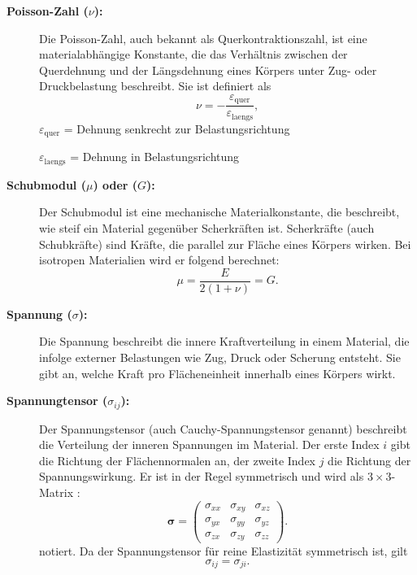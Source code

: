 \begin{description}
\item[\textbf{Poisson-Zahl ($\nu$):}]
Die Poisson-Zahl, auch bekannt als Querkontraktionszahl, ist eine
%
%
materialabhängige Konstante, die das Verhältnis zwischen der
Querdehnung und der Längsdehnung eines Körpers unter Zug- oder
%
Druckbelastung beschreibt.
Sie ist definiert als
	\begin{equation*}
		\nu=
		-\frac{\varepsilon_\text{quer}}{\varepsilon_\text{laengs}},
	\end{equation*}
	$\varepsilon_\text{quer}$ = Dehnung senkrecht zur Belastungsrichtung
	
	$\varepsilon_\text{laengs}$ = Dehnung in Belastungsrichtung
	
\item[\textbf{Schubmodul ($\mu$) oder ($G$):}]
Der Schubmodul ist eine mechanische Materialkonstante, die beschreibt,
wie steif ein Material gegenüber Scherkräften ist.
%
Scherkräfte (auch Schubkräfte) sind Kräfte, die parallel zur Fläche
eines Körpers wirken.
%
%
Bei isotropen Materialien wird er folgend berechnet:
	\begin{equation*}
		\mu = 
		\frac{E}{2(1 + \nu)} =
		G.
	\end{equation*}
\item[\textbf{Spannung ($\sigma$):}]
Die Spannung beschreibt die innere Kraftverteilung in einem Material,
die infolge externer Belastungen wie Zug, Druck oder Scherung
entsteht.
%
Sie gibt an, welche Kraft pro Flächeneinheit innerhalb eines Körpers wirkt.
	
\item[\textbf{Spannungtensor ($\sigma_{ij}$):}]
Der Spannungstensor (auch Cauchy-Spannungstensor genannt) beschreibt
%
die Verteilung der inneren Spannungen im Material.
%
Der erste Index $i$ gibt die Richtung der Flächennormalen an, der
zweite Index $j$ die Richtung der Spannungswirkung.
Er ist in der Regel symmetrisch und wird als $3\times 3$-Matrix
\cite{elastomechanik:Grundlagen_der_Elastizitaetstheorie}:
	\begin{equation*}
		\boldsymbol{\sigma} =
		\begin{pmatrix}
			\sigma_{xx} & \sigma_{xy} & \sigma_{xz} \\
			\sigma_{yx} & \sigma_{yy} & \sigma_{yz} \\
			\sigma_{zx} & \sigma_{zy} & \sigma_{zz}
		\end{pmatrix}.
	\end{equation*}
notiert.
Da der Spannungstensor für reine Elastizität symmetrisch ist, gilt
	\begin{equation*}
		\sigma_{ij} = 
		\sigma_{ji}.
	\end{equation*}
	

\end{description}
